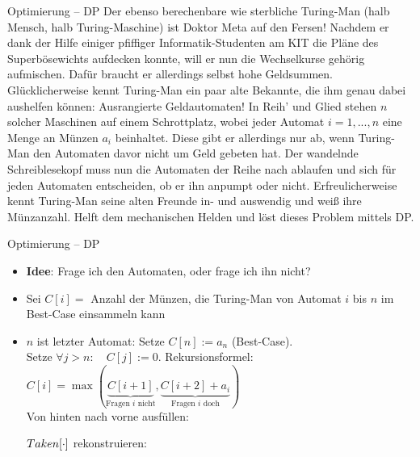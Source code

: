 \begin{frame}{Optimierung – DP}
	\vspace{-.3\baselineskip}
	Der ebenso berechenbare wie sterbliche Turing-Man {\small (halb Mensch, halb Turing-Maschine)} ist Doktor Meta auf den Fersen! Nachdem er dank der Hilfe einiger pfiffiger Informatik-Studenten am KIT die Pläne des Superbösewichts aufdecken konnte, will er nun die Wechselkurse gehörig aufmischen. Dafür braucht er allerdings selbst hohe Geldsummen. Glücklicherweise kennt Turing-Man ein paar alte Bekannte, die ihm genau dabei aushelfen können: Ausrangierte Geldautomaten! In Reih' und Glied stehen $n$ solcher Maschinen auf einem Schrottplatz, wobei jeder Automat $i = 1,...,n$ eine Menge an Münzen $a_i$ beinhaltet. Diese gibt er allerdings nur ab, wenn Turing-Man den Automaten davor nicht um Geld gebeten hat. 
	Der wandelnde Schreiblesekopf muss nun die Automaten der Reihe nach ablaufen und sich für jeden Automaten entscheiden, ob er ihn anpumpt oder nicht. Erfreulicherweise kennt Turing-Man seine alten Freunde in- und auswendig und weiß ihre Münzanzahl. Helft dem mechanischen Helden und löst dieses Problem mittels DP.
\end{frame}

\begin{frame}{Optimierung – DP}
	\solutionheading
	\begin{itemize}
		\item \textbf{Idee}: Frage ich den Automaten, oder frage ich ihn nicht?
		\item Sei $C[i] = $ Anzahl der Münzen, die Turing-Man von Automat $i$ bis $n$ im Best-Case einsammeln kann \\
		\pause
		\item $n$ ist letzter Automat: Setze $C[n] := a_n$ \: (Best-Case). \\ 
		Setze $\forall j > n: \quad C[j] := 0$.
		\implitem Rekursionsformel: \\
			$C[i] = \max(\underbrace{C[i+1]}_{\text{Fragen $i$ nicht}}, \underbrace{C[i+2] + a_i}_{\text{Fragen $i$ doch}})$\\
		\pause
		\implitem Von hinten nach vorne ausfüllen: 
		\begin{algorithm}[H]
		\end{algorithm} \vspace{-.2\baselineskip}
		$Taken[\cdot]$ rekonstruieren: \vspace{-.2\baselineskip} \\
		\begin{algorithm}[H]
		\end{algorithm}
	\end{itemize}
\end{frame}

